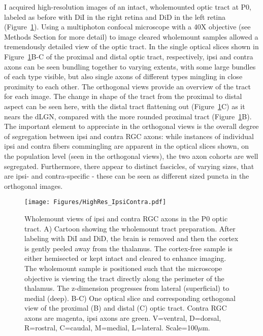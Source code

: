 I acquired high-resolution images of an intact, wholemounted optic tract at P0, labeled as before with DiI in the right retina and DiD in the left retina (Figure~\ref{Figures/HighRes_IpsiContra}).
Using a multiphoton confocal microscope with a 40X objective (see Methods Section for more detail) to image cleared wholemount samples allowed a tremendously detailed view of the optic tract.
In the single optical slices shown in Figure~\ref{Figures/HighRes_IpsiContra}B-C of the proximal and distal optic tract, respectively, ipsi and contra axons can be seen bundling together to varying extents, with some large bundles of each type visible, but also single axons of different types mingling in close proximity to each other.
The orthogonal views provide an overview of the tract for each image.
The change in shape of the tract from the proximal to distal aspect can be seen here, with the distal tract flattening out (Figure~\ref{Figures/HighRes_IpsiContra}C) as it nears the dLGN, compared with the more rounded proximal tract (Figure~\ref{Figures/HighRes_IpsiContra}B).
The important element to appreciate in the orthogonal views is the overall degree of segregation between ipsi and contra RGC axons: while instances of individual ipsi and contra fibers commingling are apparent in the optical slices shown, on the population level (seen in the orthogonal views), the two axon cohorts are well segregated.
Furthermore, there appear to distinct fascicles, of varying sizes, that are ipsi- and contra-specific - these can be seen as different sized puncta in the orthogonal images.
\begin{figure}[hbtp]
    \begin{center}
        \texttt{[image: Figures/HighRes\_IpsiContra.pdf]}
        \caption[Wholemount views of ipsi and contra RGC axons in the P0 optic tract.]
        {Wholemount views of ipsi and contra RGC axons in the P0 optic tract.
		A) Cartoon showing the wholemount tract preparation.
		After labeling with DiI and DiD, the brain is removed and then the cortex is gently peeled away from the thalamus.
		The cortex-free sample is either hemisected or kept intact and cleared to enhance imaging.
		The wholemount sample is positioned such that the microscope objective is viewing the tract directly along the perimeter of the thalamus.
		The z-dimension progresses from lateral (superficial) to medial (deep).
		B-C) One optical slice and corresponding orthogonal view of the proximal (B) and distal (C) optic tract.
		Contra RGC axons are magenta, ipsi axons are green.
		V=ventral, D=dorsal, R=rostral, C=caudal, M=medial, L=lateral.
		Scale=100$\mu$m.
		}
        \label{Figures/HighRes_IpsiContra}
    \end{center}
\end{figure}

